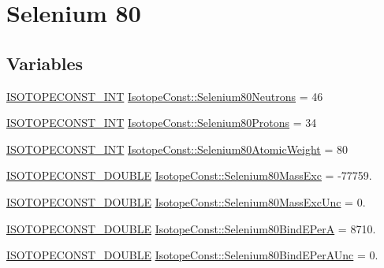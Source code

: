 \hypertarget{group___isotope_const-_selenium-_se80}{}\section{Selenium 80}
\label{group___isotope_const-_selenium-_se80}
\subsection*{Variables}
\begin{DoxyCompactItemize}
\item 
\mbox{\hyperlink{group___isotope_const-_macros_ga5f18360b3e99483a35c32d789e62621c}{I\+S\+O\+T\+O\+P\+E\+C\+O\+N\+S\+T\+\_\+\+I\+NT}} \mbox{\hyperlink{group___isotope_const-_selenium-_se80_gabd69e86b182fc3622dfee20aa5215576}{Isotope\+Const\+::\+Selenium80\+Neutrons}} = 46
\item 
\mbox{\hyperlink{group___isotope_const-_macros_ga5f18360b3e99483a35c32d789e62621c}{I\+S\+O\+T\+O\+P\+E\+C\+O\+N\+S\+T\+\_\+\+I\+NT}} \mbox{\hyperlink{group___isotope_const-_selenium-_se80_gaccabc34bc33e2dcf1f225a75de81be74}{Isotope\+Const\+::\+Selenium80\+Protons}} = 34
\item 
\mbox{\hyperlink{group___isotope_const-_macros_ga5f18360b3e99483a35c32d789e62621c}{I\+S\+O\+T\+O\+P\+E\+C\+O\+N\+S\+T\+\_\+\+I\+NT}} \mbox{\hyperlink{group___isotope_const-_selenium-_se80_ga89d8bf2a7983c65ed6a7f77c7ae514b5}{Isotope\+Const\+::\+Selenium80\+Atomic\+Weight}} = 80
\item 
\mbox{\hyperlink{group___isotope_const-_macros_ga8f45a7272ce02c0b4c65c44636ed719a}{I\+S\+O\+T\+O\+P\+E\+C\+O\+N\+S\+T\+\_\+\+D\+O\+U\+B\+LE}} \mbox{\hyperlink{group___isotope_const-_selenium-_se80_ga5c0074c432050cb25ebb6b63ea4387bc}{Isotope\+Const\+::\+Selenium80\+Mass\+Exc}} = -\/77759.
\item 
\mbox{\hyperlink{group___isotope_const-_macros_ga8f45a7272ce02c0b4c65c44636ed719a}{I\+S\+O\+T\+O\+P\+E\+C\+O\+N\+S\+T\+\_\+\+D\+O\+U\+B\+LE}} \mbox{\hyperlink{group___isotope_const-_selenium-_se80_gabfff2dc159202cd97b45bd3134c0ee7b}{Isotope\+Const\+::\+Selenium80\+Mass\+Exc\+Unc}} = 0.
\item 
\mbox{\hyperlink{group___isotope_const-_macros_ga8f45a7272ce02c0b4c65c44636ed719a}{I\+S\+O\+T\+O\+P\+E\+C\+O\+N\+S\+T\+\_\+\+D\+O\+U\+B\+LE}} \mbox{\hyperlink{group___isotope_const-_selenium-_se80_ga20d802c38f6c2d1be5fd5470402724e5}{Isotope\+Const\+::\+Selenium80\+Bind\+E\+PerA}} = 8710.
\item 
\mbox{\hyperlink{group___isotope_const-_macros_ga8f45a7272ce02c0b4c65c44636ed719a}{I\+S\+O\+T\+O\+P\+E\+C\+O\+N\+S\+T\+\_\+\+D\+O\+U\+B\+LE}} \mbox{\hyperlink{group___isotope_const-_selenium-_se80_ga69ca10710351ad8ba799aefcfd90c56e}{Isotope\+Const\+::\+Selenium80\+Bind\+E\+Per\+A\+Unc}} = 0.

\end{DoxyCompactItemize}
